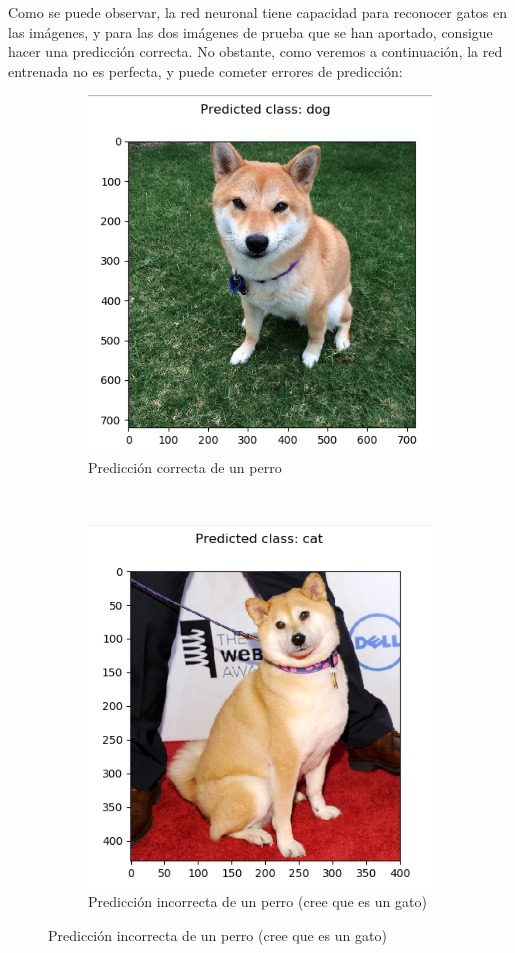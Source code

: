 \documentclass[11pt]{article}
\theoremstyle{plain}
\theoremstyle{definition}
\begin{document}
Como se puede observar, la red neuronal tiene capacidad para reconocer
gatos en las imágenes, y para las dos imágenes de prueba que se han
aportado, consigue hacer una predicción correcta. No obstante, como
veremos a continuación, la red entrenada no es perfecta, y puede cometer
errores de predicción:

\begin{figure}[ht!]
  \centering
  \begin{subfigure}[b]{0.5\textwidth}
    \centering
    \includegraphics[width=.8\textwidth]{imgs/predict_dog_correct}
    \caption{Predicción correcta de un perro}
  \end{subfigure}%
  ~
  \begin{subfigure}[b]{0.5\textwidth}
    \centering
    \includegraphics[width=.8\textwidth]{imgs/predict_dog_wrong}
    \caption{Predicción incorrecta de un perro (cree que es un gato)}
  \end{subfigure}
\end{figure}
\end{document}
